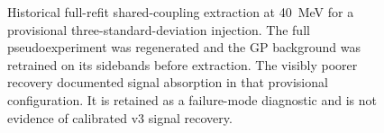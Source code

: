 \begin{landscape}
\begin{figure}[H]
\centering
{}
\caption{Historical full-refit shared-coupling extraction at \SI{40}{MeV} for a
provisional three-standard-deviation injection. The full pseudoexperiment was
regenerated and the GP background was retrained on its sidebands before extraction.
The visibly poorer recovery documented signal absorption in that provisional
configuration. It is retained as a failure-mode diagnostic and is not evidence of
calibrated v3 signal recovery.}
\label{fig:app-combined-extract-refit}
\end{figure}
\end{landscape}
\clearpage
